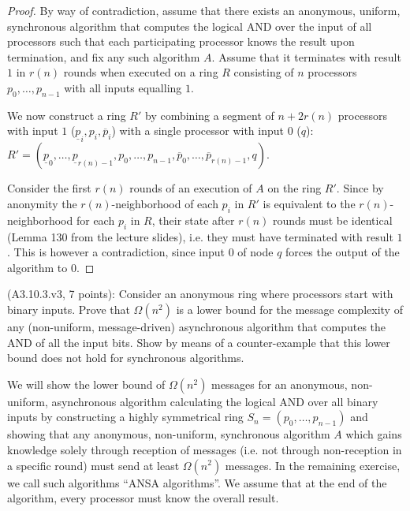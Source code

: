 \begin{proof}
By way of contradiction, assume that there exists an anonymous, uniform,
synchronous algorithm that computes the logical AND over the input of
all processors such that each participating processor knows the result upon termination,
and fix any such algorithm $A$.
Assume that it terminates with result $1$ in $r(n)$ rounds when executed on a ring $R$ consisting
of $n$ processors $p_0, \ldots, p_{n-1}$ with all inputs equalling $1$.

We now construct a ring $R'$ by combining a segment of $n + 2r(n)$ processors with input $1$
($\underline{p}_i, p_i, \overline{p}_i$) with a single processor with input $0$ ($q$):
$R' = 
(\underline{p}_0, \ldots, \underline{p}_{r(n) - 1},
 p_0, \ldots, p_{n-1},
 \overline{p}_0, \ldots, \overline{p}_{r(n) - 1},
 q)$.

Consider the first $r(n)$ rounds of an execution of $A$ on the ring $R'$. Since by anonymity
the $r(n)$-neighborhood
of each $p_i$ in $R'$ is equivalent to the $r(n)$-neighborhood for each $p_i$ in $R$, their state
after $r(n)$ rounds must be identical (Lemma 130 from the lecture slides),
i.e. they must have terminated with result $1$. This is however
a contradiction, since input $0$ of node $q$ forces the output of the algorithm to $0$.
\end{proof}


\begin{Exc}{(A3.10.3.v3, 7 points):}
Consider an anonymous ring where processors start with binary
inputs. Prove that $\Omega(n^2)$ is a lower bound for the
message complexity of any (non-uniform, message-driven)
asynchronous algorithm that computes the AND of all the
input bits. Show by means of a counter-example that this
lower bound does not hold for synchronous algorithms.
\end{Exc}

We will show the lower bound of $\Omega(n^2)$ messages for an anonymous, non-uniform,
asynchronous algorithm calculating the logical AND over all binary inputs by
constructing a highly symmetrical ring $S_n = (p_0, \ldots, p_{n-1})$ and showing
that any anonymous, non-uniform, synchronous algorithm $A$ which gains knowledge solely
through reception of messages (i.e. not through non-reception in a specific round)
must send at least $\Omega(n^2)$ messages. In the remaining exercise, we call
such algorithms ``ANSA algorithms''.
We assume that at the end of the algorithm, every processor must know the overall result.

